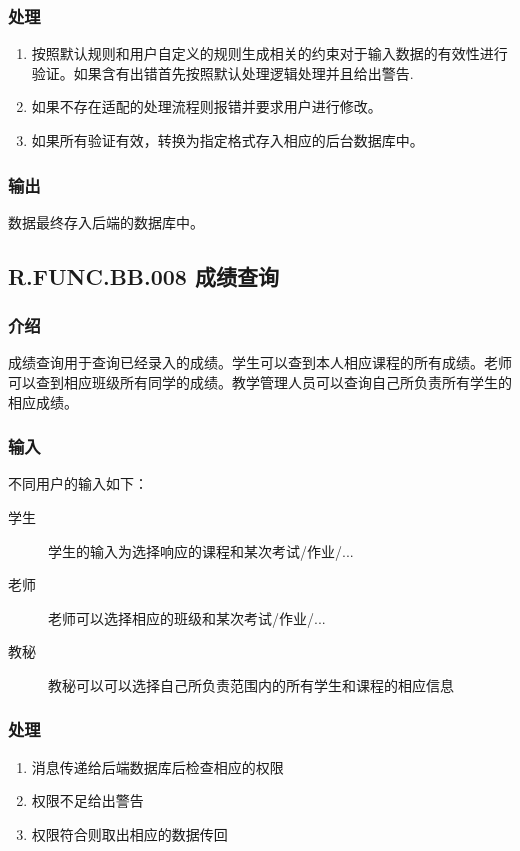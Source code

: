    \subsubsection{处理}
    \begin{enumerate}
      \item 按照默认规则和用户自定义的规则生成相关的约束对于输入数据的有效性进行验证。如果含有出错首先按照默认处理逻辑处理并且给出警告.
      \item 如果不存在适配的处理流程则报错并要求用户进行修改。
      \item 如果所有验证有效，转换为指定格式存入相应的后台数据库中。
    \end{enumerate}
    \subsubsection{输出}
    数据最终存入后端的数据库中。

  \subsection{R.FUNC.BB.008 成绩查询}
    \subsubsection{介绍}
    成绩查询用于查询已经录入的成绩。学生可以查到本人相应课程的所有成绩。老师可以查到相应班级所有同学的成绩。教学管理人员可以查询自己所负责所有学生的相应成绩。
    \subsubsection{输入}
    不同用户的输入如下：
    \begin{description}
      \item[学生] 学生的输入为选择响应的课程和某次考试/作业/...
      \item[老师] 老师可以选择相应的班级和某次考试/作业/...
      \item[教秘] 教秘可以可以选择自己所负责范围内的所有学生和课程的相应信息
    \end{description}
    \subsubsection{处理}
    \begin{enumerate}
      \item 消息传递给后端数据库后检查相应的权限
      \item 权限不足给出警告
      \item 权限符合则取出相应的数据传回
    \end{enumerate}
